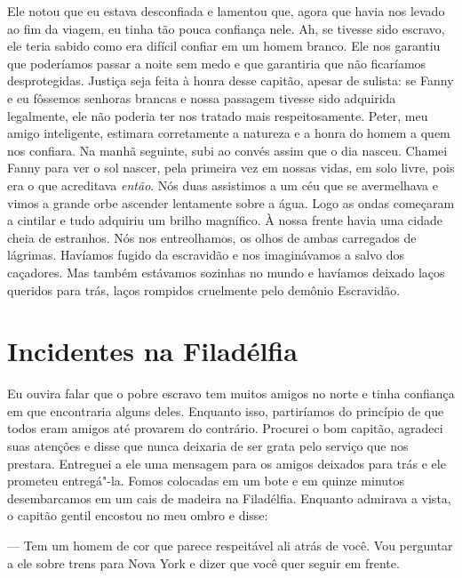 Ele notou que eu estava desconfiada e
lamentou que, agora que havia nos levado ao fim da viagem, eu tinha tão
pouca confiança nele. Ah, se tivesse sido escravo, ele teria sabido como
era difícil confiar em um homem branco. Ele nos garantiu que poderíamos
passar a noite sem medo e que garantiria que não ficaríamos
desprotegidas. Justiça seja feita à honra desse capitão, apesar de
sulista: se Fanny e eu fôssemos senhoras brancas e nossa passagem
tivesse sido adquirida legalmente, ele não poderia ter nos tratado mais
respeitosamente. Peter, meu amigo inteligente, estimara corretamente a
natureza e a honra do homem a quem nos confiara. Na manhã seguinte, subi
ao convés assim que o dia nasceu. Chamei Fanny para ver o sol nascer,
pela primeira vez em nossas vidas, em solo livre, pois era o que
acreditava \emph{então}. Nós duas assistimos a um céu que se avermelhava
e vimos a grande orbe ascender lentamente sobre a água. Logo as ondas
começaram a cintilar e tudo adquiriu um brilho magnífico. À nossa frente
havia uma cidade cheia de estranhos. Nós nos entreolhamos, os olhos de
ambas carregados de lágrimas. Havíamos fugido da escravidão e nos
imaginávamos a salvo dos caçadores. Mas também estávamos sozinhas no
mundo e havíamos deixado laços queridos para trás, laços rompidos
cruelmente pelo demônio Escravidão.

\chapter*{Incidentes na Filadélfia}

Eu ouvira falar que o pobre escravo tem
muitos amigos no norte e tinha confiança em que encontraria alguns
deles. Enquanto isso, partiríamos do princípio de que todos eram amigos
até provarem do contrário. Procurei o bom capitão, agradeci suas
atenções e disse que nunca deixaria de ser grata pelo serviço que nos
prestara. Entreguei a ele uma mensagem para os amigos deixados para trás
e ele prometeu entregá"-la. Fomos colocadas em um bote e em quinze
minutos desembarcamos em um cais de madeira na Filadélfia. Enquanto
admirava a vista, o capitão gentil encostou no meu ombro e disse:

--- Tem um homem de cor que parece respeitável ali atrás de você. Vou
perguntar a ele sobre trens para Nova York e dizer que você quer seguir
em frente.

